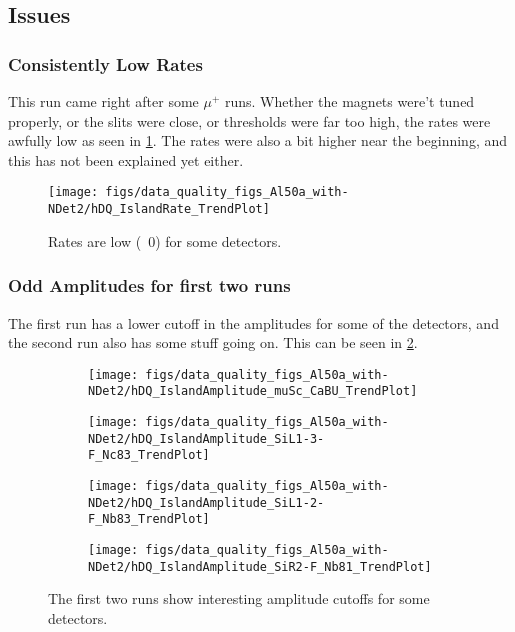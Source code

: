 \documentclass[a4paper]{article}
\begin{document}
\subsection{Issues}
\subsubsection{Consistently Low Rates}
\label{sec:al50andet2_rates}

This run came right after some $\mu^+$ runs. Whether the magnets were't tuned properly, or the slits were close, or thresholds were far too
high, the rates were awfully low as seen in \ref{fig:al50andet2_rates}. The rates were also a bit higher near the beginning, and
this has not been explained yet either.

\begin{figure}
  \centering
  \texttt{[image: figs/data\_quality\_figs\_Al50a\_with-NDet2/hDQ\_IslandRate\_TrendPlot]}
  \caption{Rates are low (~0) for some detectors.}
  \label{fig:al50andet2_rates}
\end{figure}


\subsubsection{Odd Amplitudes for first two runs}
\label{sec:al50andet2_amps}

The first run has a lower cutoff in the amplitudes for some of the detectors, and the second run also has some stuff going on. This
can be seen in \ref{fig:al50andet2_amps}.

\begin{figure}
  \centering
  \begin{subfigure}{0.5\textwidth}
    \texttt{[image: figs/data\_quality\_figs\_Al50a\_with-NDet2/hDQ\_IslandAmplitude\_muSc\_CaBU\_TrendPlot]}
  \end{subfigure}%
  \begin{subfigure}{0.5\textwidth}
    \texttt{[image: figs/data\_quality\_figs\_Al50a\_with-NDet2/hDQ\_IslandAmplitude\_SiL1-3-F\_Nc83\_TrendPlot]}
  \end{subfigure}
  \begin{subfigure}{0.5\textwidth}
    \texttt{[image: figs/data\_quality\_figs\_Al50a\_with-NDet2/hDQ\_IslandAmplitude\_SiL1-2-F\_Nb83\_TrendPlot]}
  \end{subfigure}%
  \begin{subfigure}{0.5\textwidth}
    \texttt{[image: figs/data\_quality\_figs\_Al50a\_with-NDet2/hDQ\_IslandAmplitude\_SiR2-F\_Nb81\_TrendPlot]}
  \end{subfigure}
  \caption{The first two runs show interesting amplitude cutoffs for some detectors.}
  \label{fig:al50andet2_amps}
\end{figure}
\end{document}

